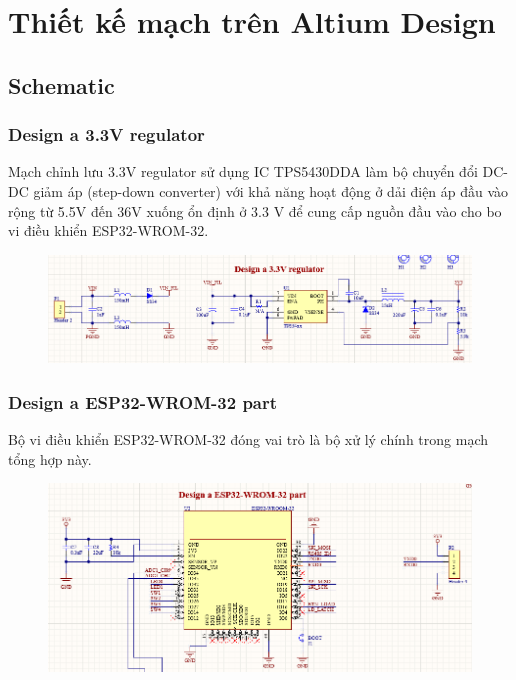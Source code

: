 \section{Thiết kế mạch trên Altium Design}

\subsection{Schematic}

\subsubsection{Design a 3.3V regulator}

Mạch chỉnh lưu 3.3V regulator sử dụng IC TPS5430DDA làm bộ chuyển đổi DC-DC giảm áp (step-down converter) với
khả năng hoạt động ở dải điện áp đầu vào rộng từ 5.5V đến 36V xuống ổn định ở 3.3 V để cung cấp nguồn đầu vào cho bo vi điều khiển ESP32-WROM-32.

\begin{figure}[!htbp]
    \centering
    \includegraphics[width=\textwidth]{graphics/section3/f1.PNG}
\end{figure}

\subsubsection{Design a ESP32-WROM-32 part}
Bộ vi điều khiển ESP32-WROM-32 đóng vai trò là bộ xử lý chính trong mạch tổng hợp này.
\begin{figure}[!htbp]
    \centering
    \includegraphics[width=\textwidth]{graphics/section3/f2.PNG}
\end{figure}


